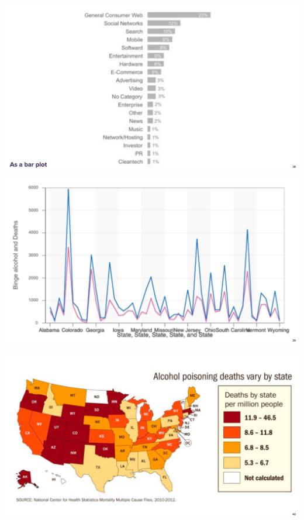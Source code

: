 \documentclass[
  ignorenonframetext,
]{beamer}
\begin{document}
\begin{frame}{}
\protect\hypertarget{section-26}{}
\includegraphics{hallofshame_figs/fig_37.png}
\end{frame}

\begin{frame}{}
\protect\hypertarget{section-27}{}
\includegraphics{hallofshame_figs/fig_38.png}
\end{frame}

\begin{frame}{}
\protect\hypertarget{section-28}{}
\includegraphics{hallofshame_figs/fig_39.png}
\end{frame}
\end{document}
